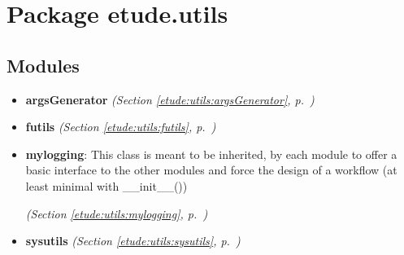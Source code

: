%
%
%


\section{Package etude.utils}

    \label{etude:utils}


\subsection{Modules}

\begin{itemize}
\setlength{\parskip}{0ex}
\item \textbf{argsGenerator}
  \textit{(Section \ref{etude:utils:argsGenerator}, p.~\pageref{etude:utils:argsGenerator})}

\item \textbf{futils}
  \textit{(Section \ref{etude:utils:futils}, p.~\pageref{etude:utils:futils})}

\item \textbf{mylogging}: This class is meant to be inherited, by each module to offer a basic 
interface to the other modules and force the design of a workflow (at least
minimal with \_\_init\_\_())



  \textit{(Section \ref{etude:utils:mylogging}, p.~\pageref{etude:utils:mylogging})}

\item \textbf{sysutils}
  \textit{(Section \ref{etude:utils:sysutils}, p.~\pageref{etude:utils:sysutils})}

\end{itemize}



